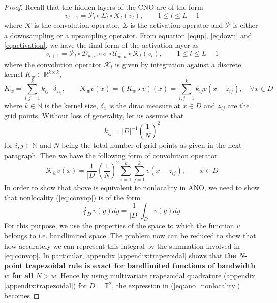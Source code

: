 \documentclass[reqno,10pt]{amsart}
\theoremstyle{plain}
\theoremstyle{definition}
\newcommand{\bb}[1]{\mathbb{#1}}
\newcommand{\cal}[1]{\mathcal{#1}}
\begin{document}
    \begin{proof}
        Recall that the hidden layers of the CNO are of the form
        \begin{equation}
            v_{l+1} = \cal P_l \circ \Sigma_l \circ \cal K_l(v_l), \qquad 1 \leq l \leq L-1
        \end{equation}
        where $\cal K$ is the convolution operator, $\Sigma$ is the activation operator and $\cal P$ is either a downsampling or a upsampling operator. From equation \ref{equp}, \ref{eqdown} and \ref{eqactivation}, we have the final form of the activation layer as 
        \begin{equation}\label{eq:cno_activation}
            v_{l+1} = \cal P_l \circ \cal D_{\overline{w},w} \circ \sigma \circ \cal U_{w,\tilde{w}} \circ \cal K_l(v_l), \qquad 1 \leq l \leq L-1
        \end{equation}
        where the convolution operator $\cal K_l$ is given by integration against a discrete kernel $K_w \in \bb R^{k \times k}$, 
        $$  K_w = \sum_{i,j = 1}^{k} k_{ij} \cdot \delta_{z_{ij}}, \qquad \cal K_wv(x) = (K_w \star v)(x) = \sum_{i,j=1}^{k}k_{ij}v(x-z_{ij}), \quad\forall x \in D$$
        where $k \in \bb N$ is the kernel size, $\delta_x$ is the dirac measure at $x \in D$ and $z_{ij}$ are the grid points. Without loss of generality, let us assume that
        \begin{equation}\label{eq:kernel_cno}
            k_{ij}= |D|^{-1}\left(\frac{1}{N}\right)^2
        \end{equation}
        for $i,j \in \bb N$ and $N$ being the total number of grid points as given in the next paragraph. Then we have the following form of convolution operator
        \begin{equation}\label{eq:convop}
            \cal K_wv(x) = \frac{1}{|D|}\left(\frac{1}{N}\right)^2 \sum_{i=1}^{k} \sum_{j=1}^{k} v(x-z_{ij}), \qquad x \in D
        \end{equation}
        In order to show that above is equivalent to nonlocality in ANO, we need to show that nonlocality (\ref{eq:convop}) is of the form
        \begin{equation}\label{eq:ano_nonlocality}
            \fint_D v(y)dy = \frac{1}{|D|} \int_D v(y)dy.
        \end{equation}
        For this purpose, we use the properties of the space to which the function $v$ belongs to i.e. bandlimited space. The problem now can be reduced to show that how accurately we can represent this integral by the summation involved in \ref{eq:convop}. In particular, appendix \ref{appendix:trapezoidal} shows that {\bf the $N$-point trapezoidal rule is exact for bandlimited functions of bandwidth $w$ for all $N > w$}. Hence by using multivariate trapezoidal quadrature (appendix \ref{appendix:trapezoidal}) for $D = \bb T^2$, the expression in (\ref{eq:ano_nonlocality}) becomes

\end{proof}
\end{document}
